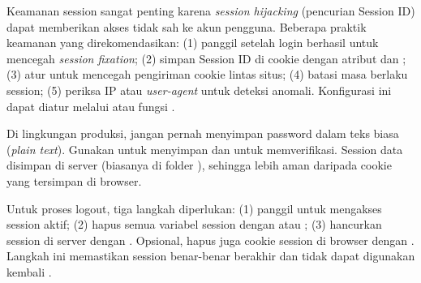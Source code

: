 Keamanan session sangat penting karena \textit{session hijacking} (pencurian Session ID) dapat memberikan akses tidak sah ke akun pengguna. Beberapa praktik keamanan yang direkomendasikan: (1) panggil  setelah login berhasil untuk mencegah \textit{session fixation}; (2) simpan Session ID di cookie dengan atribut  dan ; (3) atur  untuk mencegah pengiriman cookie lintas situs; (4) batasi masa berlaku session; (5) periksa IP atau \textit{user-agent} untuk deteksi anomali. Konfigurasi ini dapat diatur melalui  atau fungsi  \cite{owaspCsrf}.


\begin{catatan}
Di lingkungan produksi, jangan pernah menyimpan password dalam teks biasa (\textit{plain text}). Gunakan  untuk menyimpan dan  untuk memverifikasi. Session data disimpan di server (biasanya di folder ), sehingga lebih aman daripada cookie yang tersimpan di browser.
\end{catatan}

Untuk proses logout, tiga langkah diperlukan: (1) panggil  untuk mengakses session aktif; (2) hapus semua variabel session dengan  atau ; (3) hancurkan session di server dengan . Opsional, hapus juga cookie session di browser dengan . Langkah ini memastikan session benar-benar berakhir dan tidak dapat digunakan kembali \cite{phpManual}.

